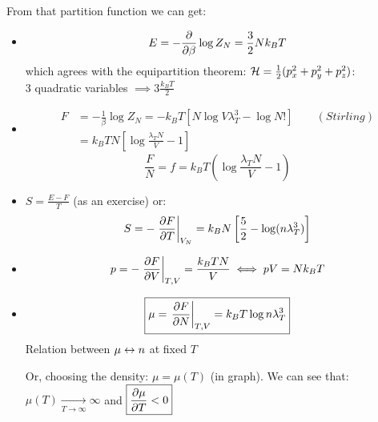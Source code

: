 From that partition function we can get:
\begin{itemize}
    \item $$ E = -\frac{\partial}{\partial\beta} \log Z_N = \frac 32 N k_BT $$
    which agrees with the equipartition theorem: $\mathcal{H} = \frac12 (p_x^2 + p_y^2 + p_z^2)$: \\3 quadratic variables $\implies 3\frac{k_BT}2$
    \item 
    \begin{align*}
    F &= -\frac 1\beta \log Z_N = -k_BT \left[N\log V{\lambda_T^3} - \log N!\right] \qquad (Stirling)\\
    &= k_BT N\left[\log \frac{\lambda_TN}V - 1\right]
    \end{align*}
    $$ \frac FN = f = k_BT\left(\log \frac{\lambda_T N}V - 1\right)$$

    \item $S = \frac{E-F}T$ (as an exercise) or:
    $$ S = -\left.\frac{\partial F}{\partial T}\right|_{V_N} = k_B N\left[\frac52 - \log (n\lambda_T^3)\right] $$
    \item $$ p = -\left.\frac{\partial F}{\partial V}\right|_{T,V} = \frac{k_BT N}V \iff pV = Nk_BT$$
\end{itemize}

\begin{wrapfigure}{r}{0.3\textwidth}
    \centering
\end{wrapfigure}

\begin{itemize}
    \item $$ \boxed{\mu = \left. \frac{\partial F}{\partial N}\right|_{T,V} = k_BT \log n\lambda_T^3}$$
    Relation between $\mu\leftrightarrow n$ at fixed $T$
    
    Or, choosing the density: $\mu = \mu(T)$ (in graph). We can see that: $\mu(T) \xrightarrow[T\to\infty]{}\infty$ \qquad and \qquad $\boxed{\frac{\partial\mu}{\partial T} < 0}$ 
    
\end{itemize}

